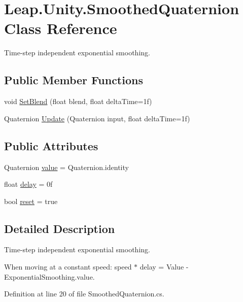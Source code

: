 \hypertarget{class_leap_1_1_unity_1_1_smoothed_quaternion}{}\section{Leap.\+Unity.\+Smoothed\+Quaternion Class Reference}
\label{class_leap_1_1_unity_1_1_smoothed_quaternion}


Time-\/step independent exponential smoothing.  


\subsection*{Public Member Functions}
\begin{DoxyCompactItemize}
\item 
void \mbox{\hyperlink{class_leap_1_1_unity_1_1_smoothed_quaternion_a36b9c959f7ee5dc289e6f40fab9929e4}{Set\+Blend}} (float blend, float delta\+Time=1f)
\item 
Quaternion \mbox{\hyperlink{class_leap_1_1_unity_1_1_smoothed_quaternion_a8848d98654ab16632fa4e4fb530d0f31}{Update}} (Quaternion input, float delta\+Time=1f)
\end{DoxyCompactItemize}
\subsection*{Public Attributes}
\begin{DoxyCompactItemize}
\item 
Quaternion \mbox{\hyperlink{class_leap_1_1_unity_1_1_smoothed_quaternion_a8bf2dc6cd2d9444187044875716f8eb1}{value}} = Quaternion.\+identity
\item 
float \mbox{\hyperlink{class_leap_1_1_unity_1_1_smoothed_quaternion_a7e8a975a354e571c8e5242995d873c3a}{delay}} = 0f
\item 
bool \mbox{\hyperlink{class_leap_1_1_unity_1_1_smoothed_quaternion_acf878e51a806a1deb2f43e2474b2391d}{reset}} = true
\end{DoxyCompactItemize}


\subsection{Detailed Description}
Time-\/step independent exponential smoothing. 

When moving at a constant speed\+: speed $\ast$ delay = Value -\/ Exponential\+Smoothing.\+value. 

Definition at line 20 of file Smoothed\+Quaternion.\+cs.



